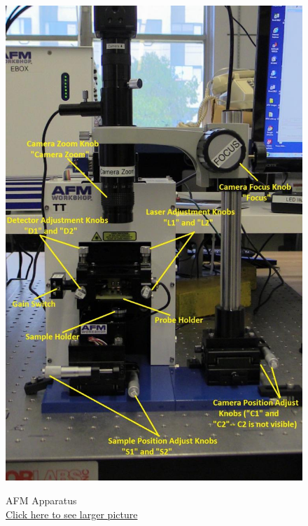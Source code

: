 \documentclass{../lab}
\begin{document}
\begin{figure}[H]
  \href{http://experimentationlab.berkeley.edu/sites/default/files/AFMImages/AFMgen.jpg}{\includegraphics[width=\linewidth,keepaspectratio]{images/AFMgen.jpg}}
  \caption{AFM Apparatus \\ \href{http://experimentationlab.berkeley.edu/sites/default/files/AFMImages/AFMgen.jpg}{Click here to see larger picture}}
  \label{fig:Apparatus}
\endminipage\hfill
{}

\end{figure}
\end{document}
